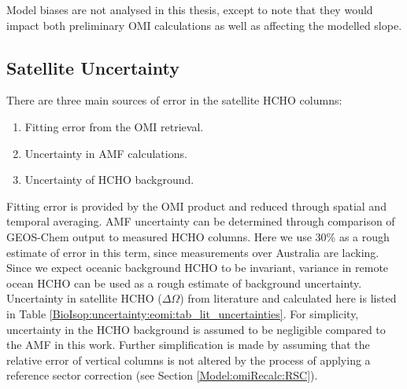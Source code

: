     Model biases are not analysed in this thesis, except to note that they would impact both preliminary OMI calculations as well as affecting the modelled slope. 
    
    
  \subsection{Satellite Uncertainty}
    \label{BioIsop:uncertainty:satellite}
    
    
    There are three main sources of error in the satellite HCHO columns:
    \begin{enumerate}
      \item Fitting error from the OMI retrieval.
      \item Uncertainty in AMF calculations.
      \item Uncertainty of HCHO background.
    \end{enumerate}
    Fitting error is provided by the OMI product and reduced through spatial and temporal averaging.
    AMF uncertainty can be determined through comparison of GEOS-Chem output to measured HCHO columns.
    Here we use 30\% as a rough estimate of error in this term, since measurements over Australia are lacking.
    Since we expect oceanic background HCHO to be invariant, variance in remote ocean HCHO can be used as a rough estimate of background uncertainty.
    Uncertainty in satellite HCHO ($\Delta{\Omega}$) from literature and calculated here is listed in Table \ref{BioIsop:uncertainty:eomi:tab_lit_uncertainties}.
    For simplicity, uncertainty in the HCHO background is assumed to be negligible compared to the AMF in this work.
    Further simplification is made by assuming that the relative error of vertical columns is not altered by the process of applying a reference sector correction (see Section \ref{Model:omiRecalc:RSC}).
    
